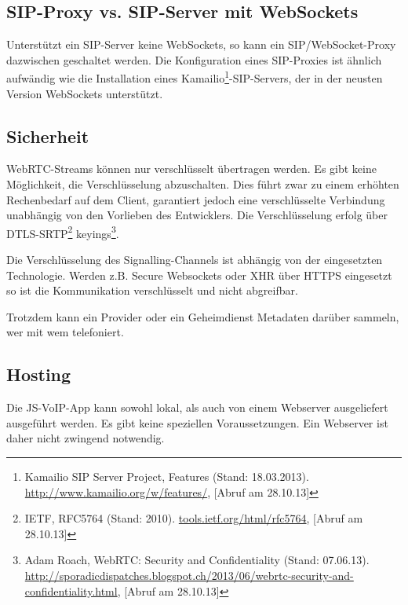 	\subsection{SIP-Proxy vs. SIP-Server mit WebSockets}
		Unterstützt ein SIP-Server keine WebSockets, so kann ein SIP/WebSocket-Proxy
		dazwischen geschaltet werden. Die Konfiguration eines SIP-Proxies ist ähnlich
		aufwändig wie die Installation eines Kamailio\footnote{Kamailio SIP Server
		Project, Features (Stand: 18.03.2013).
		\hyperlink{http://www.kamailio.org/w/features/}{http://www.kamailio.org/w/features/}, [Abruf am 28.10.13]}-SIP-Servers, der in der neusten Version WebSockets unterstützt.

	\subsection{Sicherheit}
		WebRTC-Streams können nur verschlüsselt übertragen werden. Es gibt keine
		Möglichkeit, die Verschlüsselung abzuschalten. Dies führt zwar zu einem
		erhöhten Rechenbedarf auf dem Client, garantiert jedoch eine verschlüsselte
		Verbindung unabhängig von den Vorlieben des Entwicklers.
		Die Verschlüsselung erfolg über DTLS-SRTP\footnote{IETF, RFC5764 (Stand: 2010). \hyperlink{http://tools.ietf.org/html/rfc5764}{tools.ietf.org/html/rfc5764}, [Abruf am 28.10.13]} keyings\footnote{Adam Roach, WebRTC: Security and Confidentiality (Stand: 07.06.13). \hyperlink{http://sporadicdispatches.blogspot.ch/2013/06/webrtc-security-and-confidentiality.html}{http://sporadicdispatches.blogspot.ch/2013/06/webrtc-security-and-confidentiality.html}, [Abruf am 28.10.13]}. 
		
		Die Verschlüsselung des Signalling-Channels ist abhängig von der eingesetzten
		Technologie. Werden z.B. Secure Websockets oder XHR über HTTPS eingesetzt so ist die Kommunikation verschlüsselt und nicht abgreifbar.
		
		Trotzdem kann ein Provider oder ein Geheimdienst Metadaten darüber sammeln, wer mit wem telefoniert.
		  
	\subsection{Hosting}
		Die JS-VoIP-App kann sowohl lokal, als auch von einem
		Webserver ausgeliefert ausgeführt werden. Es gibt keine speziellen Voraussetzungen. Ein Webserver ist daher nicht zwingend notwendig.
		

\clearpage
